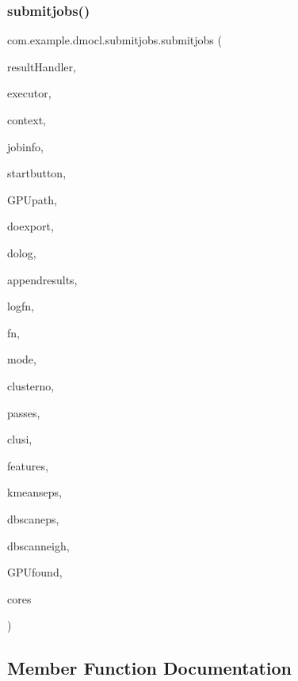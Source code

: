 \subsubsection{\texorpdfstring{submitjobs()}{submitjobs()}}
{\footnotesize\ttfamily com.\+example.\+dmocl.\+submitjobs.\+submitjobs (\begin{DoxyParamCaption}\item[{Handler}]{result\+Handler,  }\item[{Executor}]{executor,  }\item[{Context}]{context,  }\item[{Text\+View}]{jobinfo,  }\item[{Button}]{startbutton,  }\item[{String}]{G\+P\+Upath,  }\item[{boolean}]{doexport,  }\item[{boolean}]{dolog,  }\item[{boolean}]{appendresults,  }\item[{String}]{logfn,  }\item[{String}]{fn,  }\item[{String}]{mode,  }\item[{int}]{clusterno,  }\item[{int}]{passes,  }\item[{int}]{clusi,  }\item[{int}]{features,  }\item[{String}]{kmeanseps,  }\item[{String}]{dbscaneps,  }\item[{int}]{dbscanneigh,  }\item[{boolean}]{G\+P\+Ufound,  }\item[{int}]{cores }\end{DoxyParamCaption})\hspace{0.3cm}{\ttfamily [inline]}}



\subsection{Member Function Documentation}
\mbox{\label{classcom_1_1example_1_1dmocl_1_1submitjobs_a79402efd281c3fe0a661998d5874791c}} 

